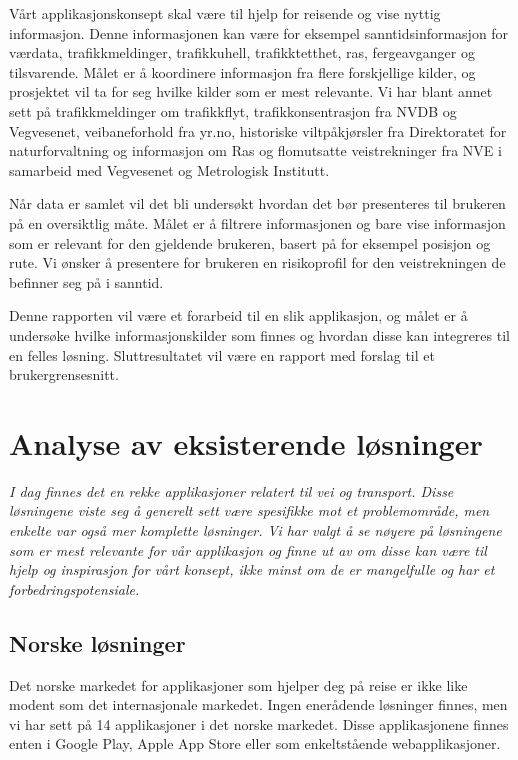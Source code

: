 \documentclass[a4paper,norsk,oneside]{book}
\begin{document}
Vårt applikasjonskonsept skal være til hjelp for reisende og vise nyttig informasjon.  Denne informasjonen kan være for eksempel sanntidsinformasjon for værdata, trafikkmeldinger, trafikkuhell, trafikktetthet, ras, fergeavganger og tilsvarende. Målet er å koordinere informasjon fra flere forskjellige kilder, og prosjektet vil ta for seg hvilke kilder som er mest relevante. Vi har blant annet sett på trafikkmeldinger om trafikkflyt,  trafikkonsentrasjon fra NVDB og Vegvesenet, veibaneforhold fra yr.no, historiske viltpåkjørsler fra Direktoratet for naturforvaltning og informasjon om Ras og flomutsatte veistrekninger fra NVE i samarbeid med Vegvesenet og Metrologisk Institutt.
	
Når data er samlet vil det bli undersøkt hvordan det bør presenteres til brukeren på en oversiktlig måte. Målet er å filtrere informasjonen og bare vise informasjon som er relevant for den gjeldende brukeren, basert på for eksempel posisjon og rute. Vi ønsker å presentere for brukeren en risikoprofil for den veistrekningen de befinner seg på i sanntid.

Denne rapporten vil være et forarbeid til en slik applikasjon, og målet er å undersøke hvilke informasjonskilder som finnes og hvordan disse kan integreres til en felles løsning. Sluttresultatet vil være en rapport med forslag til et brukergrensesnitt.

\chapter{ Analyse av eksisterende løsninger}\label{T-B}
\label{cha:TheoryAndBackground}

{\it I dag finnes det en rekke applikasjoner relatert til vei og transport. Disse løsningene viste seg å generelt sett være spesifikke mot et problemområde, men enkelte var også mer komplette løsninger. Vi har valgt å se nøyere på løsningene som er mest relevante for vår applikasjon og finne ut av om disse kan være til hjelp og inspirasjon for vårt konsept, ikke minst om de er mangelfulle og har et forbedringspotensiale.}


\section{Norske løsninger}
\label{sec:no1}

Det norske markedet for applikasjoner som hjelper deg på reise er ikke like modent som det internasjonale markedet. Ingen enerådende løsninger finnes, men vi har sett på 14 applikasjoner i det norske markedet. Disse applikasjonene finnes enten i Google Play, Apple App Store eller som enkeltstående webapplikasjoner.
\end{document}
